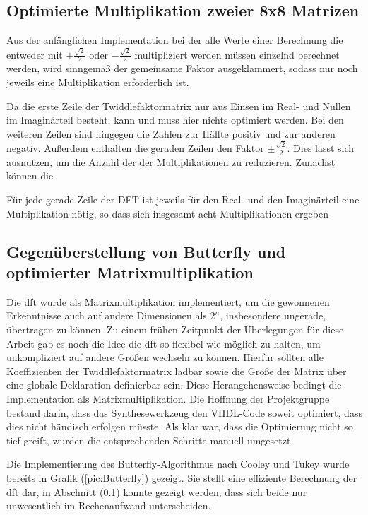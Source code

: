 \subsection{Optimierte Multiplikation zweier 8x8 Matrizen}\label{sec:OptimierteMatrixmultiplikation}

Aus der anfänglichen Implementation bei der alle Werte einer Berechnung die entweder mit $+\frac{\sqrt{2}}{2}$ oder $-\frac{\sqrt{2}}{2}$ multipliziert werden müssen 
einzelnd berechnet werden, wird sinngemäß der gemeinsame Faktor ausgeklammert, sodass nur noch jeweils eine Multiplikation erforderlich ist.

Da die erste Zeile der Twiddlefaktormatrix nur aus Einsen im Real- und Nullen im Imaginärteil besteht, kann und muss hier nichts optimiert werden. 
Bei den weiteren Zeilen sind hingegen die Zahlen zur Hälfte positiv und zur anderen negativ. Außerdem enthalten die geraden Zeilen den Faktor $\pm\frac{\sqrt{2}}{2}$. 
Dies lässt sich ausnutzen, um die Anzahl der der Multiplikationen zu reduzieren. Zunächst können die 

Für jede gerade Zeile der DFT ist jeweils für den Real- und den Imaginärteil eine Multiplikation nötig, so dass sich insgesamt acht Multiplikationen ergeben



\subsection{Gegenüberstellung von Butterfly und optimierter Matrixmultiplikation} 

Die \gls{dft} wurde als Matrixmultiplikation implementiert, um die gewonnenen Erkenntnisse auch auf andere Dimensionen als $2^n$, insbesondere ungerade, 
übertragen zu können.  
Zu einem frühen Zeitpunkt der Überlegungen für diese Arbeit gab es noch die Idee die \gls{dft} so flexibel wie möglich zu halten, um unkompliziert auf andere Größen wechseln zu können.
Hierfür sollten alle Koeffizienten der Twiddlefaktormatrix ladbar sowie die Größe der Matrix über eine globale Deklaration definierbar sein.
Diese Herangehensweise bedingt die Implementation als Matrixmultiplikation. Die Hoffnung der Projektgruppe bestand darin, dass das Synthesewerkzeug den 
VHDL-Code soweit optimiert, dass dies nicht händisch erfolgen müsste.
Als klar war, dass die Optimierung nicht so tief greift, wurden die entsprechenden Schritte manuell umgesetzt. 
  
Die Implementierung des Butterfly-Algorithmus nach Cooley und Tukey wurde bereits in Grafik (\ref{pic:Butterfly}) gezeigt. Sie stellt eine effiziente Berechnung der \gls{dft} dar, in 
Abschnitt (\ref{sec:OptimierteMatrixmultiplikation}) konnte gezeigt werden, dass sich beide nur unwesentlich im Rechenaufwand unterscheiden.


